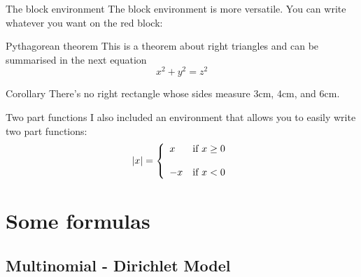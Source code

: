 \begin{frame}{The block environment}
	The block environment is more versatile. You can write whatever you want on the red block:
	\begin{block}{Pythagorean theorem}
	This is a theorem about right triangles and can be summarised in the next 
	equation 
	\[ x^2 + y^2 = z^2 \]
	\end{block}
	\begin{block}{Corollary}
	There's no right rectangle whose sides measure 3cm, 4cm, and 6cm.
	\end{block}
\end{frame}

\begin{frame}{Two part functions}
	I also included an environment that allows you to easily write two part functions:
	$$|x| =\left\{ \begin{array}{ll} x & \mbox{if } x \geq 0 \\ \\ -x & \mbox{if } x < 0 \end{array} \right.$$
\end{frame}

\section{Some formulas}

\subsection{Multinomial - Dirichlet Model}


